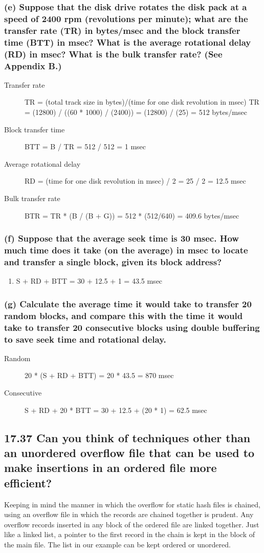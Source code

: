 \subsubsection*{(e) Suppose that the disk drive rotates the disk pack at a speed of 2400 rpm (revolutions per minute); what are the transfer rate (TR) in bytes/msec and the block transfer time (BTT) in msec? What is the average rotational delay (RD) in msec? What is the bulk transfer rate? (See Appendix B.)}
\begin{description}
\item[Transfer rate ] TR = (total track size in bytes)/(time for one disk revolution in msec) TR = (12800) / ((60 * 1000) / (2400)) = (12800) / (25) = 512 bytes/msec
\item[Block transfer time] BTT = B / TR = 512 / 512 = 1 msec
\item[Average rotational delay] RD = (time for one disk revolution in msec) / 2 = 25 / 2 = 12.5 msec
\item[Bulk transfer rate] BTR = TR * (B / (B + G)) = 512 * (512/640) = 409.6 bytes/msec
\end{description}

\subsubsection*{(f) Suppose that the average seek time is 30 msec. How much time does it take (on the average) in msec to locate and transfer a single block, given its block address?}
\begin{enumerate}
\item[] S + RD + BTT = 30 + 12.5 + 1 = 43.5 msec
\end{enumerate}

\subsubsection*{(g) Calculate the average time it would take to transfer 20 random blocks, and compare this with the time it would take to transfer 20 consecutive blocks using double buffering to save seek time and rotational delay.}
\begin{description}
\item[Random] 20 * (S + RD + BTT) = 20 * 43.5 = 870 msec
\item[Consecutive] S + RD + 20 * BTT = 30 + 12.5 + (20 * 1) = 62.5 msec
\end{description}

\subsection*{17.37 Can you think of techniques other than an unordered overflow file that can be used to make insertions in an ordered file more efficient?}
Keeping in mind the manner in which the overflow for static hash files is chained, using an overflow file in which the records are chained together is prudent. Any overflow records inserted in any block of the ordered file are linked together. Just like a linked list, a pointer to the first record in the chain is kept in the block of the main file. The list in our example can be kept ordered or unordered.

